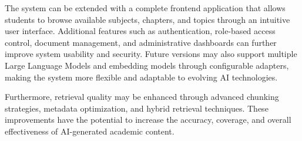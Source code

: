 The system can be extended with a complete frontend application that allows students to browse available subjects, chapters, and topics through an intuitive user interface. Additional features such as authentication, role-based access control, document management, and administrative dashboards can further improve system usability and security. Future versions may also support multiple Large Language Models and embedding models through configurable adapters, making the system more flexible and adaptable to evolving AI technologies. \par

Furthermore, retrieval quality may be enhanced through advanced chunking strategies, metadata optimization, and hybrid retrieval techniques. These improvements have the potential to increase the accuracy, coverage, and overall effectiveness of AI-generated academic content. \par